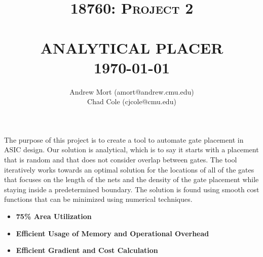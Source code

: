 \documentclass[9pt]{extarticle}
\title{ \Large \textsc{18760: Project 2}
\\[2.0cm]
\HRule{0.5pt}\\
\Huge\textbf{\uppercase{Analytical Placer}}
\HRule{2pt} \\[0.5cm]
\Large \today
}
\author{
    \Large
    Andrew Mort (amort@andrew.cmu.edu)\\
    Chad Cole (cjcole@cmu.edu)\\
}
\date{} %
\makeatletter
\def\printtitle{\centering \@title\par}
\def\printauthor{\centering \large \@author}
\makeatother
\begin{document}
\thispagestyle{empty}

\printtitle
\vfill
\printauthor

\clearpage
\raggedright



\begin{homeworkProblem}[Introduction]

    The purpose of this project is to create a tool to automate gate placement in ASIC design. Our solution is analytical, which is to say it starts with a placement that is random and that does not consider overlap between gates. The tool iteratively works towards an optimal solution for the locations of all of the gates that focuses on the length of the nets and the density of the gate placement while staying inside a predetermined boundary. The solution is found using smooth cost
    functions that can be minimized using numerical techniques. 

\end{homeworkProblem}

\begin{homeworkProblem}[Goals]

    \begin{itemize}
        \item\textbf{75\% Area Utilization}
        \item\textbf{Efficient Usage of Memory and Operational Overhead}
        \item\textbf{Efficient Gradient and Cost Calculation}
    \end{itemize}
\end{homeworkProblem}
\end{document}
